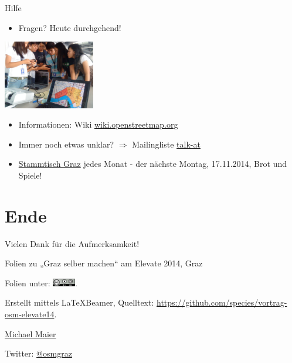 \documentclass{beamer}
\begin{document}
%
%
%

\begin{frame}{Hilfe}

\begin{itemize}
  \item Fragen? Heute durchgehend!
\end{itemize}
 \begin{center}
	  \includegraphics[width=4cm]{osm_workshop.jpg}
 \end{center}
\begin{itemize}
  \item Informationen: Wiki \href{http://wiki.openstreetmap.org}{wiki.openstreetmap.org}
  \item Immer noch etwas unklar? $\Rightarrow$ Mailingliste \href{http://lists.openstreetmap.org/listinfo/talk-at}{talk-at}
  \pause
  \item \href{http://wiki.openstreetmap.org/wiki/Graz/Stammtisch}{Stammtisch Graz} jedes Monat - der nächste Montag, 17.11.2014, Brot und Spiele!
\end{itemize}

\end{frame}

\section{Ende}

\begin{frame}{Vielen Dank für die Aufmerksamkeit!}

  Folien zu „Graz selber machen“ am Elevate 2014, Graz
\vspace{1cm}

Folien unter: \includegraphics[width=1cm]{cc-by-sa.png}.
\vspace{1cm}

Erstellt mittels \LaTeX Beamer, Quelltext: \url{https://github.com/species/vortrag-osm-elevate14}.
\vspace{1cm}

\href{mailto:michael.maier@student.tugraz.at}{Michael Maier}

Twitter: \href{https://twitter.com/osmgraz}{@osmgraz}
\end{frame}
\end{document}
